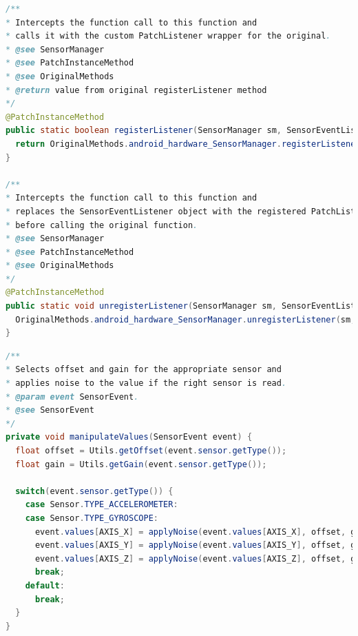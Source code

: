 \documentclass[11pt,
  oneside,openany,    %
]{scrreprt}
\begin{document}
\begin{lstlisting}[language=java, caption=Intercept Methods, label=lst:intercept_method]
/**
* Intercepts the function call to this function and
* calls it with the custom PatchListener wrapper for the original.
* @see SensorManager
* @see PatchInstanceMethod
* @see OriginalMethods
* @return value from original registerListener method
*/
@PatchInstanceMethod
public static boolean registerListener(SensorManager sm, SensorEventListener listener, Sensor sensor, int samplingPeriodUs) {
  return OriginalMethods.android_hardware_SensorManager.registerListener(sm, addListener(listener, sensor), sensor, samplingPeriodUs);
}

/**
* Intercepts the function call to this function and
* replaces the SensorEventListener object with the registered PatchListener
* before calling the original function.
* @see SensorManager
* @see PatchInstanceMethod
* @see OriginalMethods
*/
@PatchInstanceMethod
public static void unregisterListener(SensorManager sm, SensorEventListener listener) {
  OriginalMethods.android_hardware_SensorManager.unregisterListener(sm, removeListener(listener, null));
}
\end{lstlisting}
\pagebreak
\begin{lstlisting}[language=java, caption=Noise Generating Function, label=lst:noise_gen_func]
/**
* Selects offset and gain for the appropriate sensor and
* applies noise to the value if the right sensor is read.
* @param event SensorEvent.
* @see SensorEvent
*/
private void manipulateValues(SensorEvent event) {
  float offset = Utils.getOffset(event.sensor.getType());
  float gain = Utils.getGain(event.sensor.getType());

  switch(event.sensor.getType()) {
    case Sensor.TYPE_ACCELEROMETER:
    case Sensor.TYPE_GYROSCOPE:
      event.values[AXIS_X] = applyNoise(event.values[AXIS_X], offset, gain);
      event.values[AXIS_Y] = applyNoise(event.values[AXIS_Y], offset, gain);
      event.values[AXIS_Z] = applyNoise(event.values[AXIS_Z], offset, gain);
      break;
    default:
      break;
  }
}
\end{lstlisting}
\end{document}
